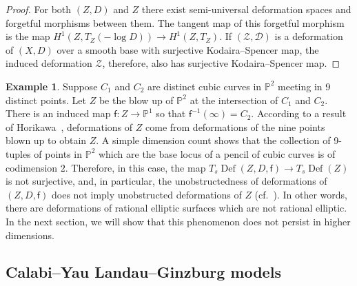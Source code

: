 \documentclass[10pt]{amsart}
\numberwithin{equation}{section}
\theoremstyle{plain}
\theoremstyle{definition}
\newtheorem{example}[theorem]{Example}
\theoremstyle{remark}
\DeclareMathOperator{\Def}{Def}
\begin{document}
\begin{proof}
  For both \((Z,D)\) and \(Z\) there exist semi-universal deformation spaces and forgetful morphisms between them. The tangent map of this forgetful morphism is the map \(H^1(Z,T_Z(-\log D)) \rightarrow H^1(Z,T_Z)\). If \((\mathscr{Z},\mathscr{D})\) is a deformation of \((X,D)\) over a smooth base with surjective Kodaira--Spencer map, the induced deformation \(\mathscr{Z}\), therefore, also has surjective Kodaira--Spencer map.
\end{proof}

\begin{example}
  Suppose \(C_1\) and \(C_2\) are distinct cubic curves in \(\mathbb{P}^2\) meeting in 9 distinct points. Let \(Z\) be the blow up of \(\mathbb{P}^2\) at the intersection of \(C_1\) and \(C_2\). There is an induced map \(\mathsf{f} \colon Z \rightarrow \mathbb{P}^1\) so that \(\mathsf{f}^{-1}(\infty) = C_2\). According to a result of Horikawa~\cite{horikawa1976deformations}, deformations of \(Z\) come from deformations of the nine points blown up to obtain \(Z\). A simple dimension count shows that the collection of 9-tuples of points in \(\mathbb{P}^2\) which are the base locus of a pencil of cubic curves is of codimension \(2\).  Therefore, in this case, the map \(T_s \Def(Z,D,\mathsf{f})\rightarrow T_s \Def(Z)\) is not surjective, and, in particular, the unobstructedness of deformations of \((Z,D,\mathsf{f})\) does not imply unobstructed deformations of \(Z\) (cf.~\cite[Corollary 2.18]{katzarkov2017bogomolov}). In other words, there are deformations of rational elliptic surfaces which are not rational elliptic. In the next section, we will show that this phenomenon does not persist in higher dimensions.
\end{example}

\subsection{Calabi--Yau Landau--Ginzburg models}
\end{document}
